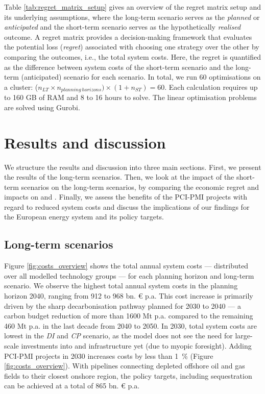 \documentclass[final,5p,times,twocolumn,sort&compress]{elsarticle}
\begin{document}
Table \ref{tab:regret_matrix_setup} gives an overview of the regret matrix setup and its underlying assumptions, where the long-term scenario serves as the \textit{planned} or \textit{anticipated} and the short-term scenario serves as the hypothetically \textit{realised} outcome. A regret matrix provides a decision-making framework that evaluates the potential loss (\textit{regret}) associated with choosing one strategy over the other by comparing the outcomes, i.e., the total system costs. Here, the regret is quantified as the difference between system costs of the short-term scenario and the long-term (anticipated) scenario for each scenario. 
In total, we run 60 optimisations on a cluster: ($n_{LT} \times n_{planning\,horizons}) \times (1+n_{ST}) = 60$. Each calculation requires up to 160 GB of RAM and 8 to 16 hours to solve. The linear optimisation problems are solved using Gurobi.

\section{Results and discussion}
\label{sec:results_and_discussion}
We structure the results and discussion into three main sections. First, we present the results of the long-term scenarios. Then, we look at the impact of the short-term scenarios on the long-term scenarios, by comparing the economic regret and impacts on  and . Finally, we assess the benefits of the PCI-PMI projects with regard to reduced system costs and discuss the implications of our findings for the European energy system and its policy targets. 

\subsection{Long-term scenarios}
\label{sec:long-term_scenarios}
Figure \ref{fig:costs_overview} shows the total annual system costs --- distributed over all modelled technology groups --- for each planning horizon and long-term scenario. We observe the highest total annual system costs in the planning horizon 2040, ranging from 912 to 968 bn. \euro{} p.a. This cost increase is primarily driven by the sharp decarbonisation pathway planned for 2030 to 2040 --- a carbon budget reduction of more than 1600 Mt p.a. compared to the remaining 460 Mt p.a. in the last decade from 2040 to 2050. In 2030, total system costs are lowest in the \textit{DI} and \textit{CP} scenario, as the model does not see the need for large-scale investments into  and  infrastructure yet (due to myopic foresight). Adding PCI-PMI projects in 2030 increases costs by less than \SI{1}{\percent} (Figure \ref{fig:costs_overview}). With  pipelines connecting depleted offshore oil and gas fields to their closest onshore region, the policy targets, including  sequestration can be achieved at a total of 865 bn. \euro{} p.a. 
\end{document}
